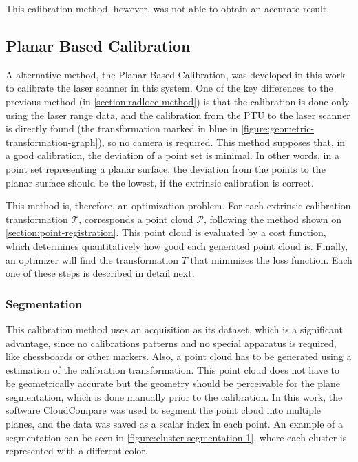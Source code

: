 This calibration method, however, was not able to obtain an accurate result.
\FloatBarrier

\subsection{Planar Based Calibration}
\label{section:proposed-method}

A alternative method, the Planar Based Calibration, was developed in this work to calibrate the laser scanner in this system. One of the key differences to the previous method (in \cref{section:radlocc-method}) is that the calibration is done only using the laser range data, and the calibration from the PTU to the laser scanner is directly found (the transformation marked in blue in \cref{figure:geometric-transformation-graph}), so no camera is required. This method supposes that, in a good calibration, the deviation of a point set is minimal. In other words, in a point set representing a planar surface, the deviation from the points to the planar surface should be the lowest, if the extrinsic calibration is correct.

This method is, therefore, an optimization problem. For each extrinsic calibration transformation $\mathcal{T}$, corresponds a point cloud $\mathcal{P}$, following the method shown on \cref{section:point-registration}. This point cloud is evaluated by a cost function, which determines quantitatively how good each generated point cloud is. Finally, an optimizer will find the transformation $T$ that minimizes the loss function. Each one of these steps is described in detail next.

\subsubsection{Segmentation}

This calibration method uses an acquisition as its dataset, which is a significant advantage, since no calibrations patterns and no special apparatus is required, like chessboards or other markers. Also, a point cloud has to be generated using a estimation of the calibration transformation. This point cloud does not have to be geometrically accurate but the geometry should be perceivable for the plane segmentation, which is done manually prior to the calibration. In this work, the software CloudCompare was used to segment the point cloud into multiple planes, and the data was saved as a scalar index in each point. An example of a segmentation can be seen in \cref{figure:cluster-segmentation-1}, where each cluster is represented with a different color.

